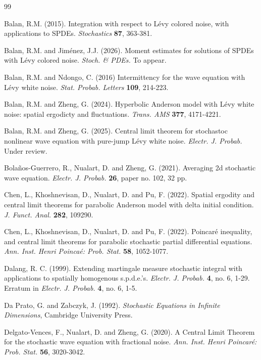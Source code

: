 \documentclass[12pt]{article}
\begin{document}
\begin{thebibliography}{99}

 Balan, R.M. (2015). Integration with respect to L\'evy colored noise, with applications to SPDEs. {\em Stochastics} {\bf 87}, 363-381.
    
 Balan, R.M. and Jim\'enez, J.J. (2026). Moment estimates for solutions of SPDEs 
with L\'evy colored noise. {\em Stoch. \& PDEs.} To appear.

    
  Balan, R.M. and Ndongo, C. (2016)  Intermittency for the wave equation with L\'evy white noise. {\em Stat. Probab. Letters} {\bf 109}, 214-223.    


 Balan, R.M. and Zheng, G. (2024). Hyperbolic Anderson model with L\'evy white noise: spatial ergodicty and fluctuations. {\em Trans. AMS} {\bf 377}, 4171-4221.
    
  Balan, R.M. and Zheng, G. (2025). Central limit theorem for stochastoc nonlinear wave equation with pure-jump L\'evy white noise. {\em Electr. J. Probab.} Under review.
    
 Bola\~{n}os-Guerrero, R., Nualart, D. and Zheng, G. (2021). Averaging 2d stochastic wave equation. {\em Electr. J. Probab.}
{\bf 26}, paper no. 102, 32 pp.

 Chen, L., Khoshnevisan, D., Nualart, D. and Pu, F. (2022).
Spatial ergodity and central limit theorems for parabolic Anderson model with delta initial condition.
{\em J. Funct. Anal.} {\bf 282}, 109290.

 Chen, L., Khoshnevisan, D., Nualart, D. and Pu, F. (2022).
Poincar\'e inequality, and central limit theorems
for parabolic stochastic partial differential equations.
{\em Ann. Inst. Henri Poinca\'e: Prob. Stat.} {\bf 58}, 1052-1077.


 Dalang, R. C. (1999). Extending martingale
measure stochastic integral with applications to spatially
homogenous s.p.d.e.'s. {\em Electr. J. Probab.} {\bf 4}, no. 6,
1-29. Erratum in {\em Electr. J. Probab.} {\bf 4}, no. 6, 1-5.

 Da Prato, G. and Zabczyk, J. (1992).
{\em Stochastic Equations in Infinite Dimensions}, Cambridge
University Press.


 Delgato-Vences, F., Nualart, D. and Zheng, G. (2020). A Central Limit Theorem for the stochastic wave equation with fractional noise. {\em Ann. Inst. Henri Poincar\'e: Prob. Stat.} {\bf 56}, 3020-3042.
    

\end{thebibliography}
\end{document}
